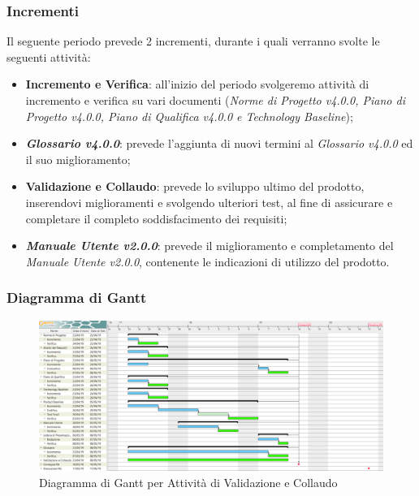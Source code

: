 \subsubsection{Incrementi}
Il seguente periodo prevede 2 incrementi, durante i quali verranno svolte le seguenti attività:
\begin{itemize}
	\item \textbf{Incremento e Verifica}: all'inizio del periodo svolgeremo attività di incremento e verifica su vari documenti (\textit{Norme di Progetto v4.0.0, Piano di Progetto v4.0.0, Piano di Qualifica v4.0.0 e Technology Baseline});
	\item \textbf{\textit{Glossario v4.0.0}}: prevede l'aggiunta di nuovi termini al \textit{Glossario v4.0.0} ed il suo miglioramento;
	\item \textbf{Validazione e Collaudo}: prevede lo sviluppo ultimo del prodotto, inserendovi miglioramenti e svolgendo ulteriori test, al fine di assicurare e completare il completo soddisfacimento dei requisiti;
	\item \textbf{\textit{Manuale Utente v2.0.0}}: prevede il miglioramento e completamento del \textit{Manuale Utente v2.0.0}, contenente le indicazioni di utilizzo del prodotto.
\end{itemize}

\begin{landscape}
\subsubsection{Diagramma di Gantt}
\begin{figure}[H]
	\centering
  		\includegraphics[width=1.0\linewidth]{./images/ValidazioneeCollaudo.png}
  		\caption{Diagramma di Gantt per Attività di Validazione e Collaudo}
  		\label{fig:Gantt Validazione e Collaudo}
\end{figure}
\end{landscape}